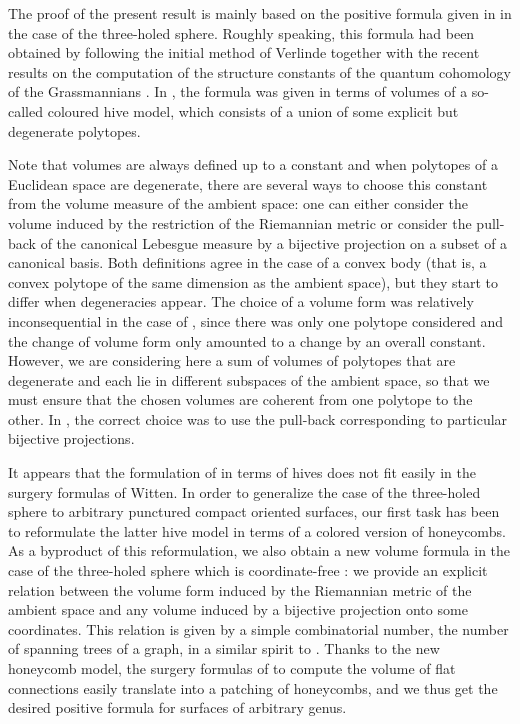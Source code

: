 \documentclass[11pt,a4paper]{amsart}
\numberwithin{equation}{section}
\theoremstyle{definition}
\begin{document}
The proof of the present result is mainly based on the positive formula given in \cite{françois2024positiveformulaproductconjugacy} in the case of the three-holed sphere. 
Roughly speaking, this formula had been obtained by following the initial method of Verlinde together with the recent results on the computation 
of the structure constants of the quantum cohomology of the Grassmannians \cite{Buch_Kresch_Purbhoo_Tamvakis}. 
In \cite{françois2024positiveformulaproductconjugacy}, the formula was given in terms of volumes of a so-called coloured hive model, 
which consists of a union of some explicit but degenerate polytopes. 

Note that volumes are always defined up to a constant and when polytopes of a Euclidean space are degenerate, there are several ways 
to choose this constant from the volume measure of the ambient space: one can either consider the volume induced by the restriction of 
the Riemannian metric or consider the pull-back of the canonical Lebesgue measure by a bijective projection on a subset of a canonical basis. 
Both definitions agree in the case of a convex body (that is, a convex polytope of the same dimension as the ambient space), but they start to differ when degeneracies appear. 
The choice of a volume form was relatively inconsequential in the case of \cite{knutson2004honeycomb}, since there was only one polytope 
considered and the change of volume form only amounted to a change by an overall constant. 
However, we are considering here a sum of volumes of polytopes that are degenerate and each lie in different subspaces of the ambient space, so that we must ensure that the chosen volumes are coherent from one polytope to the other. 
In \cite{françois2024positiveformulaproductconjugacy}, the correct choice was to use the pull-back corresponding to particular bijective projections. 

It appears that the formulation of \cite{françois2024positiveformulaproductconjugacy} in terms of hives does not fit easily in the surgery formulas of Witten. 
In order to generalize the case of the three-holed sphere to arbitrary punctured compact oriented surfaces, our first task has been to reformulate 
the latter hive model in terms of a colored version of honeycombs. As a byproduct of this reformulation, 
we also obtain a new volume formula in the case of the three-holed sphere which is coordinate-free : we provide an explicit relation between 
the volume form induced by the Riemannian metric of the ambient space and any volume induced by a bijective projection onto some coordinates. 
This relation is given by a simple combinatorial number, the number of spanning trees of a graph, in a similar spirit to \cite{kassel2022determinantal}. 
Thanks to the new honeycomb model, the surgery formulas of \cite{witten1992two} to compute the volume of flat connections easily translate into a patching of honeycombs, 
and we thus get the desired positive formula for surfaces of arbitrary genus.
\end{document}

